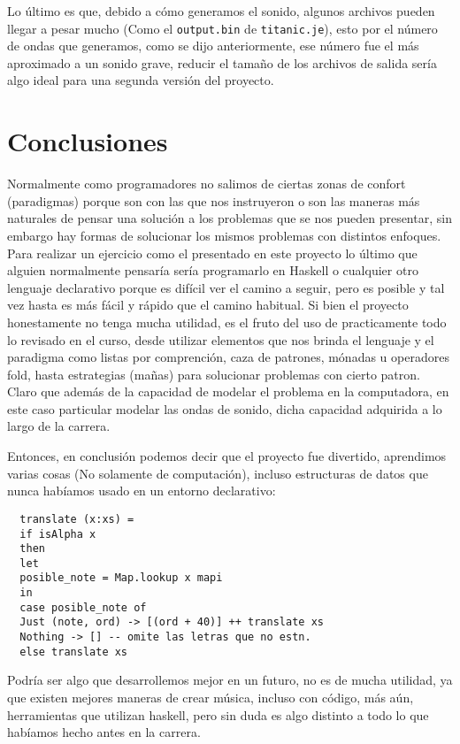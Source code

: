 \documentclass[10pt,a4paper]{article}
\begin{document}
Lo último es que, debido a cómo generamos el sonido, algunos archivos pueden
llegar a pesar mucho (Como el \texttt{output.bin} de \texttt{titanic.je}), esto
por el número de ondas que generamos, como se dijo anteriormente, ese número fue
el más aproximado a un sonido grave, reducir el tamaño de los archivos de salida
sería algo ideal para una segunda versión del proyecto.

\section{Conclusiones}
\noindent Normalmente como programadores no salimos de ciertas zonas de confort
(paradigmas) porque son con las que nos instruyeron o son las maneras más
naturales de pensar una solución a los problemas que se nos pueden presentar, sin
embargo hay formas de solucionar los mismos problemas con distintos enfoques.
Para realizar un ejercicio como el presentado en este proyecto lo último que
alguien normalmente pensaría sería programarlo en Haskell o cualquier otro
lenguaje declarativo porque es difícil ver el camino a seguir, pero es posible y
tal vez hasta es más fácil y rápido que el camino habitual. Si bien el proyecto
honestamente no tenga mucha utilidad, es el fruto del uso de practicamente todo
lo revisado en el curso, desde utilizar elementos que nos brinda el lenguaje y el
paradigma como listas por comprención, caza de patrones, mónadas u operadores
fold, hasta estrategias (mañas) para solucionar problemas con cierto patron.
Claro que además de la capacidad de modelar el problema en la computadora, en
este caso particular modelar las ondas de sonido, dicha capacidad adquirida a lo
largo de la carrera.

Entonces, en conclusión podemos decir que el proyecto fue divertido, aprendimos
varias cosas (No solamente de computación), incluso estructuras de datos que
nunca habíamos usado en un entorno declarativo:

\begin{verbatim}
  translate (x:xs) =
  if isAlpha x
  then
  let
  posible_note = Map.lookup x mapi
  in
  case posible_note of
  Just (note, ord) -> [(ord + 40)] ++ translate xs
  Nothing -> [] -- omite las letras que no estn.
  else translate xs
\end{verbatim}

Podría ser algo que desarrollemos mejor en un futuro, no es de mucha utilidad,
ya que existen mejores maneras de crear música, incluso con código, más aún,
herramientas que utilizan haskell\cite{tidal}, pero sin duda es algo distinto a
todo lo que habíamos hecho antes en la carrera.

 {
  \nocite{paul}
  \nocite{tidal}
  \nocite{u2}
  \nocite{otro}
}

\end{document}
